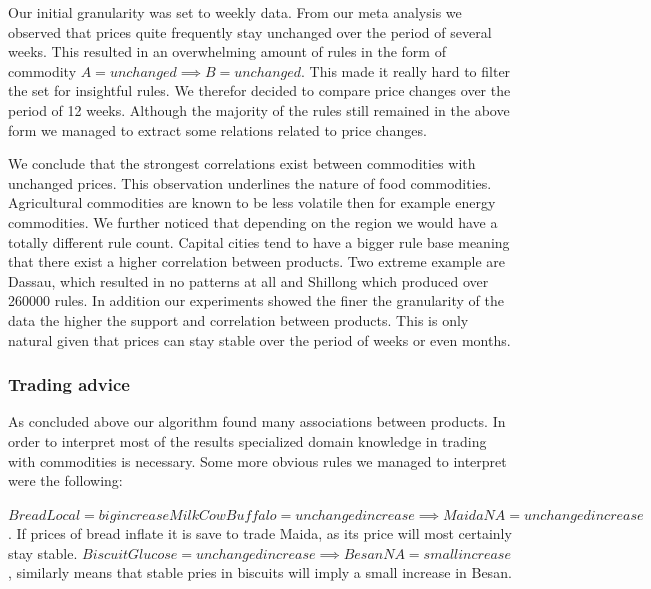 Our initial granularity was set to weekly data. From our meta analysis we observed that prices quite frequently stay unchanged over the period of several weeks. This resulted in an overwhelming amount of rules in the form of commodity $A = unchanged \implies B= unchanged$. This made it really hard to filter the set for insightful rules. We therefor decided to compare price changes over the period of 12 weeks. Although the majority of the rules still remained in the above form we managed to extract some relations related to price changes. 

We conclude that the strongest correlations exist between commodities with unchanged prices. This observation underlines the nature of food commodities. Agricultural commodities are known to be less volatile then for example energy commodities. We further noticed that depending on the region we would have a totally different rule count. Capital cities tend to have a bigger rule base meaning that there exist a higher correlation between products. Two extreme example are Dassau, which resulted in no patterns at all and Shillong which produced over 260000 rules. In addition our experiments showed the finer the granularity of the data the higher the support and correlation between products. This is only natural given that prices can stay stable over the period of weeks or even months. 

\subsubsection{Trading advice }

As concluded above our algorithm found many associations between products. In order to interpret most of the results specialized domain knowledge in trading with commodities is  necessary. Some more obvious rules we managed to interpret were the following:

$BreadLocal=big increase MilkCowBuffalo=unchanged increase \implies MaidaNA=unchanged increase$. If prices of bread inflate it is save to trade Maida, as its price will most certainly stay stable. $BiscuitGlucose=unchanged increase \implies BesanNA=small increase$, similarly means that stable pries in biscuits will imply a small increase in Besan. 



